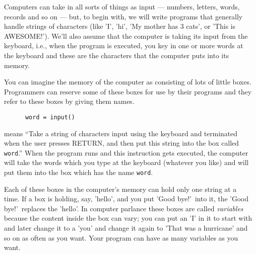 Computers can take in all sorts of things as input --- numbers,
letters, words, records and so on --- but, to begin with, we will
write programs that generally handle strings of characters (like
'I', 'hi', 'My mother has 3 cats', or 'This is AWESOME!').
We'll also assume that the computer is taking its input from the
keyboard, i.e., when the program is executed, you key in one or more
words at the keyboard and these are the characters that the computer 
puts into its memory.

You can imagine the memory of the computer as consisting of lots of
little boxes.  Programmers can reserve some of these boxes for
use by their programs and they refer to these boxes by giving
them names.  

\begin{Verbatim}
      word = input()
\end{Verbatim}

means ``Take a string of characters input using the keyboard and
terminated when the user presses RETURN, and
then put this string into the box called \verb!word!.''  When the program runs and
this instruction gets executed, the computer will take the words which
you type at the keyboard (whatever you like) and will put them into
the box which has the name \verb!word!.

Each of these boxes in the computer's memory can hold only one string at a time.  If a box is
holding, say, 'hello', and you put 'Good bye!'\ into it, the
'Good bye!'\ replaces the 'hello'.  In computer parlance these
boxes are called \emph{variables} because the content inside the box
can vary; you can put an 'I' in it to start with and later change it
to a 'you' and change it again to 'That was a hurricane' and so on
as often as you want.
Your program can have as many variables as you want.



